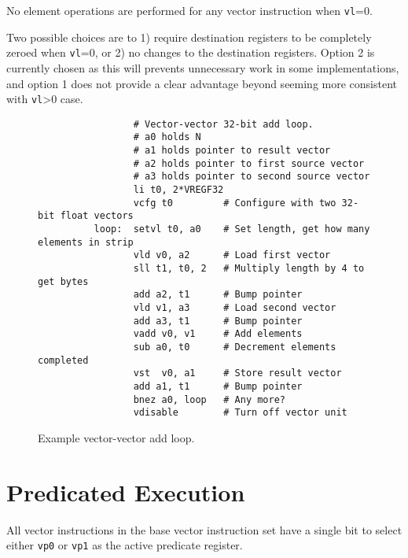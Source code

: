 No element operations are performed for any vector instruction when
{\tt vl}=0.

\begin{commentary}
  Two possible choices are to 1) require destination registers to be
  completely zeroed when {\tt vl}=0, or 2) no changes to the
  destination registers.  Option 2 is currently chosen as this will
  prevents unnecessary work in some implementations, and option 1 does
  not provide a clear advantage beyond seeming more consistent with
  {\tt vl}>0 case.
\end{commentary}

\begin{figure}[bt]
  \centering
\begin{verbatim}
                 # Vector-vector 32-bit add loop.
                 # a0 holds N
                 # a1 holds pointer to result vector
                 # a2 holds pointer to first source vector
                 # a3 holds pointer to second source vector
                 li t0, 2*VREGF32
                 vcfg t0         # Configure with two 32-bit float vectors
          loop:  setvl t0, a0    # Set length, get how many elements in strip
                 vld v0, a2      # Load first vector
                 sll t1, t0, 2   # Multiply length by 4 to get bytes
                 add a2, t1      # Bump pointer
                 vld v1, a3      # Load second vector
                 add a3, t1      # Bump pointer
                 vadd v0, v1     # Add elements
                 sub a0, t0      # Decrement elements completed
                 vst  v0, a1     # Store result vector
                 add a1, t1      # Bump pointer
                 bnez a0, loop   # Any more?
                 vdisable        # Turn off vector unit
\end{verbatim}
\caption{Example vector-vector add loop.}
\label{fig:vvadd}
\end{figure}

\section{Predicated Execution}

All vector instructions in the base vector instruction set have a
single bit to select either {\tt vp0} or {\tt vp1} as the active
predicate register.

